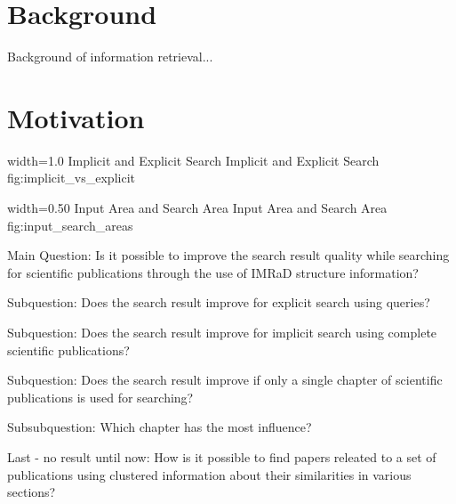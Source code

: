 \section{Background}
\label{sec:background}

Background of information retrieval...

\section{Motivation}
\label{sec:Motivation}

      {width=1.0\textwidth}
      {Implicit and Explicit Search}
      {Implicit and Explicit Search}
      {fig:implicit_vs_explicit}

      {width=0.50\textwidth}
      {Input Area and Search Area}
      {Input Area and Search Area}
      {fig:input_search_areas}


Main Question: Is it possible to improve the search result quality while searching for scientific publications through the use of IMRaD structure information?

Subquestion: Does the search result improve for explicit search using queries?

Subquestion: Does the search result improve for implicit search using complete scientific publications?

Subquestion: Does the search result improve if only a single chapter of scientific publications is used for searching?

Subsubquestion: Which chapter has the most influence?

Last - no result until now: How is it possible to find papers releated to a set of publications using clustered information about their similarities in various sections?
